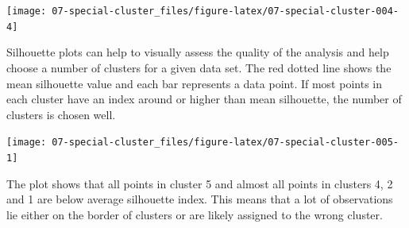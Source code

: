 \documentclass[
]{scrbook}
\newenvironment{Shaded}{\begin{snugshade}}{\end{snugshade}}
\newcommand{\AttributeTok}[1]{\textcolor[rgb]{0.77,0.63,0.00}{#1}}
\newcommand{\CommentTok}[1]{\textcolor[rgb]{0.56,0.35,0.01}{\textit{#1}}}
\newcommand{\DecValTok}[1]{\textcolor[rgb]{0.00,0.00,0.81}{#1}}
\newcommand{\FunctionTok}[1]{\textcolor[rgb]{0.00,0.00,0.00}{#1}}
\newcommand{\NormalTok}[1]{#1}
\newcommand{\OtherTok}[1]{\textcolor[rgb]{0.56,0.35,0.01}{#1}}
\newcommand{\SpecialCharTok}[1]{\textcolor[rgb]{0.00,0.00,0.00}{#1}}
\newcommand{\StringTok}[1]{\textcolor[rgb]{0.31,0.60,0.02}{#1}}
\renewenvironment{Shaded} {\begin{snugshade}\small} {\end{snugshade}}
\begin{document}
\begin{center}\texttt{[image: 07-special-cluster\_files/figure-latex/07-special-cluster-004-4]} \end{center}

Silhouette plots can help to visually assess the quality of the analysis and help choose a number of clusters for a given data set.
The red dotted line shows the mean silhouette value and each bar represents a data point.
If most points in each cluster have an index around or higher than mean silhouette, the number of clusters is chosen well.

\begin{Shaded}
\end{Shaded}

\begin{center}\texttt{[image: 07-special-cluster\_files/figure-latex/07-special-cluster-005-1]} \end{center}

The plot shows that all points in cluster 5 and almost all points in clusters 4, 2 and 1 are below average silhouette index.
This means that a lot of observations lie either on the border of clusters or are likely assigned to the wrong cluster.

\begin{Shaded}
\end{Shaded}
\end{document}
